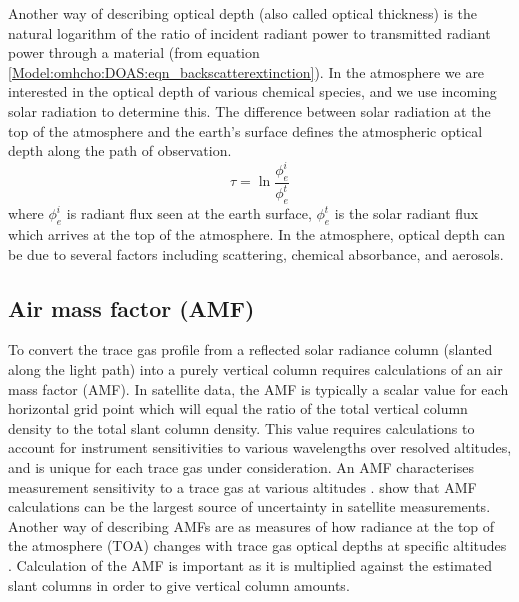     Another way of describing optical depth (also called optical thickness) is the natural logarithm of the ratio of incident radiant power to transmitted radiant power through a material (from equation \ref{Model:omhcho:DOAS:eqn_backscatterextinction}).
    In the atmosphere we are interested in the optical depth of various chemical species, and we use incoming solar radiation to determine this.
    The difference between solar radiation at the top of the atmosphere and the earth's surface defines the atmospheric optical depth along the path of observation.
    \begin{equation*}
      \tau = \ln{\frac{\phi_e^i}{\phi_e^t}}
    \end{equation*}
    where $\phi_e^i$ is radiant flux seen at the earth surface, $\phi_e^t$ is the solar radiant flux which arrives at the top of the atmosphere.
    In the atmosphere, optical depth can be due to several factors including scattering, chemical absorbance, and aerosols.
  
  \subsection{Air mass factor (AMF)}
  \label{Model:omhcho:amf}
    To convert the trace gas profile from a reflected solar radiance column (slanted along the light path) into a purely vertical column requires calculations of an air mass factor (AMF).
    In satellite data, the AMF is typically a scalar value for each horizontal grid point which will equal the ratio of the total vertical column density to the total slant column density.
    This value requires calculations to account for instrument sensitivities to various wavelengths over resolved altitudes, and is unique for each trace gas under consideration.
    An AMF characterises measurement sensitivity to a trace gas at various altitudes \cite[e.g.]{Palmer2001}.
    \textcite{Lorente2017} show that AMF calculations can be the largest source of uncertainty in satellite measurements.
    Another way of describing AMFs are as measures of how radiance at the top of the atmosphere (TOA) changes with trace gas optical depths at specific altitudes \parencite{Lorente2017}.
    Calculation of the AMF is important as it is multiplied against the estimated slant columns in order to give vertical column amounts.
    

